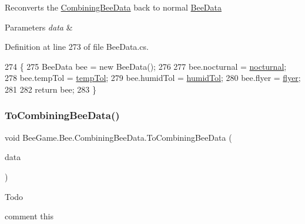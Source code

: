 Reconverts the \hyperlink{struct_bee_game_1_1_bee_1_1_combining_bee_data}{Combining\+Bee\+Data} back to normal \hyperlink{struct_bee_game_1_1_bee_1_1_bee_data}{Bee\+Data} 


\begin{DoxyParams}{Parameters}
{\em data} & \\
\hline
\end{DoxyParams}


Definition at line 273 of file Bee\+Data.\+cs.


\begin{DoxyCode}
274         \{
275             BeeData bee = \textcolor{keyword}{new} BeeData();
276 
277             bee.nocturnal = \hyperlink{struct_bee_game_1_1_bee_1_1_combining_bee_data_a337800df462a764c58328d21d2398d6c}{nocturnal};
278             bee.tempTol = \hyperlink{struct_bee_game_1_1_bee_1_1_combining_bee_data_a31cebfaca3139379e30a43fa0ac7e338}{tempTol};
279             bee.humidTol = \hyperlink{struct_bee_game_1_1_bee_1_1_combining_bee_data_a98c56c89bcd5f983b4d022c113f789e3}{humidTol};
280             bee.flyer = \hyperlink{struct_bee_game_1_1_bee_1_1_combining_bee_data_ac0af7556cf90035ff830a6e121e8d4c4}{flyer};
281 
282             \textcolor{keywordflow}{return} bee;
283         \}
\end{DoxyCode}
\mbox{\label{struct_bee_game_1_1_bee_1_1_combining_bee_data_abdf4646728337da76097aed9b74347ae}} 
\subsubsection{\texorpdfstring{To\+Combining\+Bee\+Data()}{ToCombiningBeeData()}}
{\footnotesize\ttfamily void Bee\+Game.\+Bee.\+Combining\+Bee\+Data.\+To\+Combining\+Bee\+Data (\begin{DoxyParamCaption}\item[{\hyperlink{struct_bee_game_1_1_bee_1_1_bee_data}{Bee\+Data}}]{data }\end{DoxyParamCaption})}





\begin{DoxyRefDesc}{Todo}
\item[\hyperlink{todo__todo000002}{Todo}]comment this \end{DoxyRefDesc}

